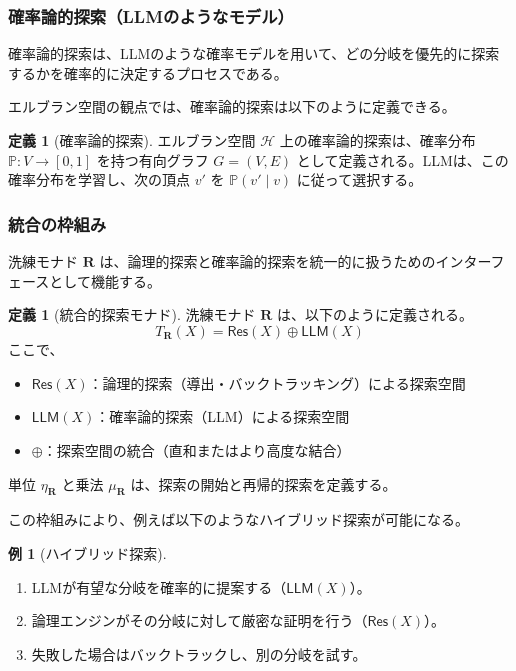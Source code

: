 \documentclass[11pt,a4paper]{ltjsarticle}
\theoremstyle{definition}
\newtheorem{definition}[theorem]{定義}
\newtheorem{example}[theorem]{例}
\newcommand{\Mr}{\mathbf{R}}
\newcommand{\Herbrand}{\mathcal{H}}
\newcommand{\Res}{\mathsf{Res}}
\newcommand{\LLM}{\mathsf{LLM}}
\newcommand{\Prob}{\mathbb{P}}
\begin{document}
\subsubsection{確率論的探索（LLMのようなモデル）}

確率論的探索は、LLMのような確率モデルを用いて、どの分岐を優先的に探索するかを確率的に決定するプロセスである\cite{llm}。

エルブラン空間の観点では、確率論的探索は以下のように定義できる。

\begin{definition}[確率論的探索]
エルブラン空間 $\Herbrand$ 上の確率論的探索は、確率分布 $\Prob : V \to [0,1]$ を持つ有向グラフ $G = (V, E)$ として定義される。LLMは、この確率分布を学習し、次の頂点 $v'$ を $\Prob(v' \mid v)$ に従って選択する。
\end{definition}

\subsubsection{統合の枠組み}

洗練モナド $\Mr$ は、論理的探索と確率論的探索を統一的に扱うためのインターフェースとして機能する。

\begin{definition}[統合的探索モナド]
洗練モナド $\Mr$ は、以下のように定義される。
\[
T_{\Mr}(X) = \Res(X) \oplus \LLM(X)
\]
ここで、
\begin{itemize}
\item $\Res(X)$：論理的探索（導出・バックトラッキング）による探索空間
\item $\LLM(X)$：確率論的探索（LLM）による探索空間
\item $\oplus$：探索空間の統合（直和またはより高度な結合）
\end{itemize}
単位 $\eta_{\Mr}$ と乗法 $\mu_{\Mr}$ は、探索の開始と再帰的探索を定義する。
\end{definition}

この枠組みにより、例えば以下のようなハイブリッド探索が可能になる。

\begin{example}[ハイブリッド探索]
\begin{enumerate}
\item LLMが有望な分岐を確率的に提案する（$\LLM(X)$）。
\item 論理エンジンがその分岐に対して厳密な証明を行う（$\Res(X)$）。
\item 失敗した場合はバックトラックし、別の分岐を試す。
\end{enumerate}
\end{example}
\end{document}
